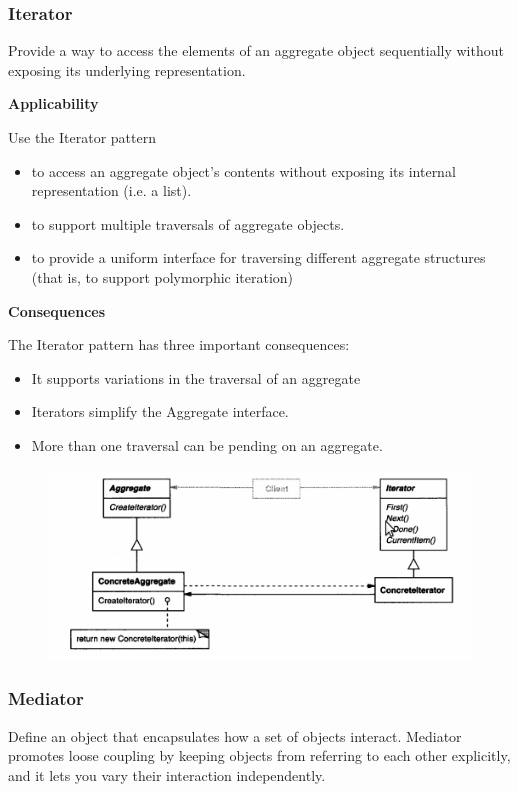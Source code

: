 \documentclass{article}
\begin{document}
\newpage
\subsubsection{Iterator}
Provide a way to access the elements of an aggregate object sequentially without exposing its underlying representation.

\textbf{Applicability}

Use the Iterator pattern

\begin{itemize}
    \item to access an aggregate object's contents without exposing its internal representation (i.e. a list).
    \item to support multiple traversals of aggregate objects.
    \item to provide a uniform interface for traversing different aggregate structures (that is, to support polymorphic iteration)
\end{itemize}

\textbf{Consequences}

The Iterator pattern has three important consequences:
\begin{itemize}
    \item It supports variations in the traversal of an aggregate
    \item Iterators simplify the Aggregate interface.
    \item More than one traversal can be pending on an aggregate.
\end{itemize}

\begin{figure}[h]
    \centering
    \includegraphics[width=14cm]{diagrams/pattern-16-iterator.png}
\end{figure}

\newpage
\subsubsection{Mediator}
Define an object that encapsulates how a set of objects interact. Mediator promotes loose coupling by keeping objects from referring to each other explicitly, and it lets you vary their interaction independently.
\end{document}
